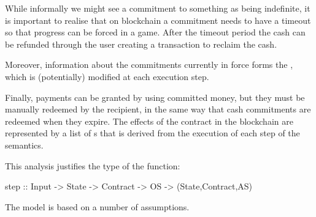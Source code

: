 \documentclass[
      acmsmall
    , screen
    , review=true
  ]{acmart}
\begin{document}
While informally we might see a commitment to something as being indefinite, it is important to realise that on blockchain a commitment needs to have a timeout so that progress can be forced in a game. After the timeout period the cash can be refunded through the user creating a transaction to reclaim the cash.

Moreover, information about the commitments currently in force forms the , which is (potentially) modified at each execution step. 

Finally, payments can be granted by using committed money, but they must be manually redeemed by the recipient, in the 
same way that cash commitments are redeemed when they expire. The effects of the contract in the blockchain are 
represented by a list  of s that is derived from the execution of each step of the semantics.

This analysis justifies the type of the  function:

\begin{haskellcode}
step :: Input -> State -> Contract -> OS -> (State,Contract,AS)
\end{haskellcode}

The model is based on a number of assumptions.
\end{document}

